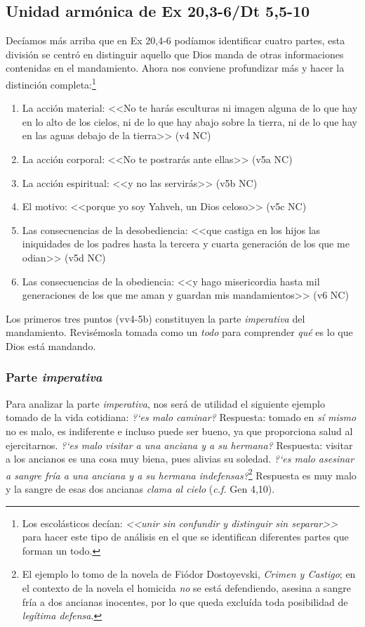 \documentclass{article}
\begin{document}
\subsection{Unidad arm\'onica de Ex 20,3-6/Dt 5,5-10}

Dec\'{i}amos m\'as arriba que en Ex 20,4-6 pod\'{i}amos identificar cuatro partes, esta divisi\'on se centr\'o en distinguir aquello que Dios manda de otras informaciones contenidas en el mandamiento. Ahora nos conviene profundizar m\'as y hacer la distinci\'on completa:\footnote{Los escol\'asticos dec\'{i}an: \emph{<<unir sin confundir y distinguir sin separar>>} para hacer este tipo de an\'alisis en el que se identifican diferentes partes que forman un todo.}

\begin{enumerate}
\item La acci\'on material: <<No te har\'as esculturas ni imagen alguna de lo que hay en lo alto de los cielos, ni de lo que hay abajo sobre la tierra, ni de lo que hay en las aguas debajo de la tierra>> (v4 NC)
\item La acci\'on corporal: <<No te postrar\'as ante ellas>> (v5a NC)
\item La acci\'on espiritual: <<y no las servir\'as>> (v5b NC)
\item El motivo: <<porque yo soy Yahveh, un Dios celoso>> (v5c NC)
\item Las consecuencias de la desobediencia: <<que castiga en los hijos las iniquidades de los padres hasta la tercera y cuarta generaci\'on de los que me odian>> (v5d NC)
\item Las consecuencias de la obediencia: <<y hago misericordia hasta mil generaciones de los que me aman y guardan mis mandamientos>> (v6 NC)
\end{enumerate}

\noindent
Los primeros tres puntos (vv4-5b) constituyen la parte \emph{imperativa} del mandamiento. Revis\'emosla tomada como un \emph{todo} para comprender \emph{qu\'e} es lo que Dios est\'a mandando.

\subsubsection{Parte \emph{imperativa}}

Para analizar la parte \emph{imperativa}, nos ser\'a de utilidad el siguiente ejemplo tomado de la vida cotidiana: \emph{?`es malo caminar?} Respuesta: tomado en \emph{s\'i mismo} no es malo, es indiferente e incluso puede ser bueno, ya que proporciona salud al ejercitarnos. \emph{?`es malo visitar a una anciana y a su hermana?} Respuesta: visitar a los ancianos es una cosa muy biena, pues alivias su soledad. \emph{?`es malo asesinar a sangre fr\'{i}a a una anciana y a su hermana indefensas?}\footnote{El ejemplo lo tomo de la novela de Fiódor Dostoyevski, \emph{Crimen y Castigo}; en el contexto de la novela el homicida \emph{no} se est\'a defendiendo, asesina a sangre fr\'{i}a a dos ancianas inocentes, por lo que queda exclu\'{i}da toda posibilidad de \emph{leg\'{i}tima defensa}.} Respuesta es muy malo y la sangre de esas dos ancianas \emph{clama al cielo} (\emph{c.f.} Gen 4,10).
\end{document}
